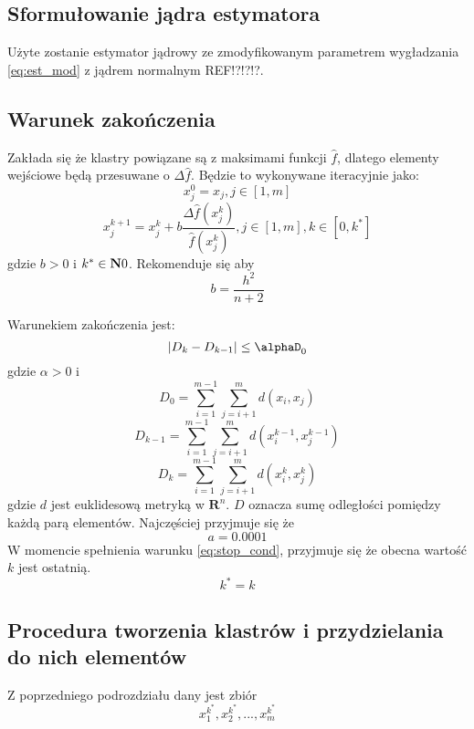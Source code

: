 \subsection{Sformułowanie jądra estymatora}
\label{subsec:jadro_estymatora}
Użyte zostanie estymator jądrowy ze zmodyfikowanym parametrem wygładzania \ref{eq:est_mod} z jądrem normalnym REF!?!?!?.

\subsection{Warunek zakończenia}
\label{subsec:stop_cond}
Zakłada się że klastry powiązane są z maksimami funkcji $\hat{
f}$, dlatego elementy wejściowe będą przesuwane o $\Delta\hat{f}$. Będzie to wykonywane iteracyjnie jako:
\begin{equation}
x^0_j=x_j, j\in [1,m]
\end{equation}
\begin{equation}
x^{k+1}_j=x^k_j+b\frac{\Delta\hat{f}(x^k_j)}{\hat{f}(x^k_j)}, j \in [1,m], k \in [0,k^*]
\end{equation}
gdzie $b > 0$ i $k^* \in \mathbf{N}\\{0}$. Rekomenduje się aby
\begin{equation}
b=\frac{h^2}{n+2}
\end{equation} 

Warunekiem zakończenia jest:
\begin{equation}
\label{eq:stop_cond}
|D_k-D_{k-1}| \leq \alphaD_0
\end{equation}
gdzie $\alpha>0$ i 
\begin{equation}
D_0 = \displaystyle\sum_{i=1}^{m-1} \displaystyle\sum_{j=i+1}^{m} d(x_i, x_j)
\end{equation}
\begin{equation}
D_{k-1} = \displaystyle\sum_{i=1}^{m-1} \displaystyle\sum_{j=i+1}^{m} d(x_i^{k-1}, x_j^{k-1})
\end{equation}
\begin{equation}
D_{k} = \displaystyle\sum_{i=1}^{m-1} \displaystyle\sum_{j=i+1}^{m} d(x_i^{k}, x_j^{k})
\end{equation}
gdzie $d$ jest euklidesową metryką w $\mathbf{R}^n$. $D$ oznacza sumę odległości pomiędzy każdą parą elementów. Najczęściej przyjmuje się że
\begin{equation}
a= 0.0001
\end{equation}
W momencie spełnienia warunku \ref{eq:stop_cond}, przyjmuje się że obecna wartość $k$ jest ostatnią.
\begin{equation}
k^*=k
\end{equation}

\subsection{Procedura tworzenia klastrów i przydzielania do nich elementów}
\label{subsec:tworzenie_klastrow}
Z poprzedniego podrozdziału dany jest zbiór
\begin{equation}
x^{k^*}_1, x^{k^*}_2, ..., x^{k^*}_m 
\end{equation}
